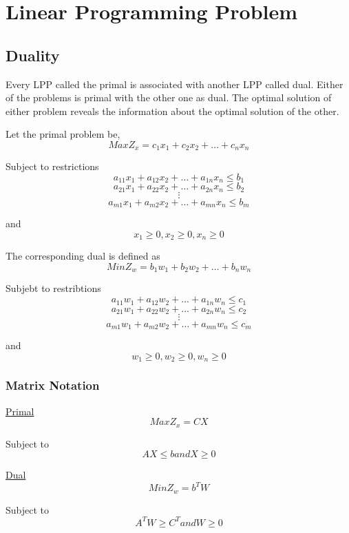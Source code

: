 \section{Linear Programming Problem}

\subsection{Duality}
Every LPP called the primal is associated with another LPP called dual.
Either of the problems is primal with the other one as dual. The optimal
solution of either problem reveals the information about the optimal
solution of the other.

Let the primal problem be,
$$ Max Z_{x} = c_{1}x_{1} + c_{2}x_{2} + \ldots + c_{n}x_{n} $$

Subject to restrictions
$$ a_{11}x_{1} + a_{12}x_{2} + \ldots + a_{1n}x_{n} \leq b_{1} $$
$$ a_{21}x_{1} + a_{22}x_{2} + \ldots + a_{2n}x_{n} \leq b_{2} $$
$$ \vdots $$
$$ a_{m1}x_{1} + a_{m2}x_{2} + \ldots + a_{mn}x_{n} \leq b_{m} $$

and
$$ x_{1} \geq 0, x_{2} \geq 0, x_{n} \geq 0 $$

The corresponding dual is defined as
$$ Min Z_{w} = b_{1}w_{1} + b_{2}w_{2} + \ldots + b_{n}w_{n} $$

Subjebt to restribtions
$$ a_{11}w_{1} + a_{12}w_{2} + \ldots + a_{1n}w_{n} \leq c_{1} $$
$$ a_{21}w_{1} + a_{22}w_{2} + \ldots + a_{2n}w_{n} \leq c_{2} $$
$$ \vdots $$
$$ a_{m1}w_{1} + a_{m2}w_{2} + \ldots + a_{mn}w_{n} \leq c_{m} $$

and
$$ w_{1} \geq 0, w_{2} \geq 0, w_{n} \geq 0 $$

\subsubsection{Matrix Notation}

\begin{multicols}{2}

\underline{Primal}
$$ Max Z_{x} = CX $$

Subject to
$$ AX \leq b and X \geq 0 $$

\underline{Dual}
$$ Min Z_{w} = b^{T}W $$

Subject to
$$ A^{T}W \geq C^{T} and W \geq 0 $$

\end{multicols}

